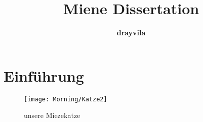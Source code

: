 \documentclass[ngerman,12pt]{scrreprt}
\author{\textbf{drayvila}}
\title{Miene Dissertation}
\begin{document}
\maketitle

\tableofcontents

\listoftables

\listoffigures



\chapter{Einführung}

\blindtext[2]



\begin{figure} [b]
\begin{center}
\texttt{[image: Morning/Katze2]}
\caption{unsere Miezekatze}\label{fig:katze}
\end{center}
\end{figure}
\end{document}
